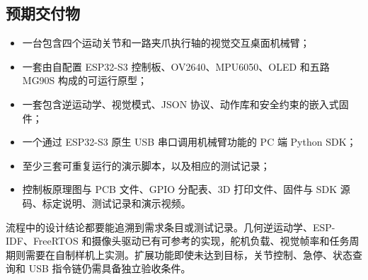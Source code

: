 \subsection{预期交付物}

\begin{itemize}
  \item 一台包含四个运动关节和一路夹爪执行轴的视觉交互桌面机械臂；
  \item 一套由自配置 ESP32-S3 控制板、OV2640、MPU6050、OLED 和五路 MG90S 构成的可运行原型；
  \item 一套包含逆运动学、视觉模式、JSON 协议、动作库和安全约束的嵌入式固件；
  \item 一个通过 ESP32-S3 原生 USB 串口调用机械臂功能的 PC 端 Python SDK；
  \item 至少三套可重复运行的演示脚本，以及相应的测试记录；
  \item 控制板原理图与 PCB 文件、GPIO 分配表、3D 打印文件、固件与 SDK 源码、标定说明、测试记录和演示视频。
\end{itemize}

流程中的设计结论都要能追溯到需求条目或测试记录。几何逆运动学、ESP-IDF、FreeRTOS 和摄像头驱动已有可参考的实现，舵机负载、视觉帧率和任务周期则需要在自制样机上实测。扩展功能即使未达到目标，关节控制、急停、状态查询和 USB 指令链仍需具备独立验收条件。



